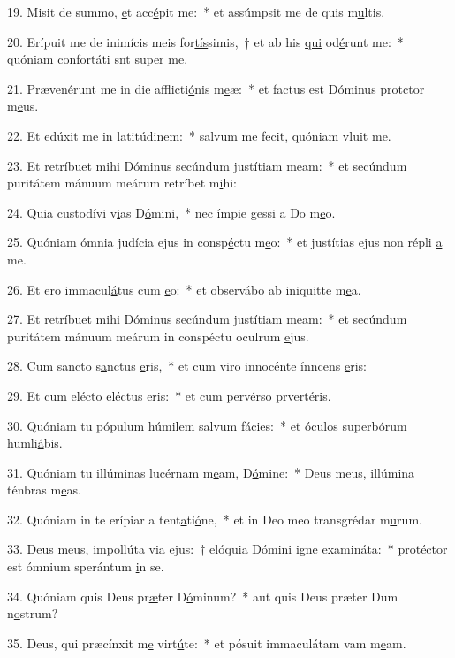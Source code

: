19. Misit de summo, \uline{e}t acc\uline{é}pit me:~* et assúmpsit me de quis m\uline{u}ltis.\par 
20. Erípuit me de inimícis meis for\uline{tís}simis,~† et ab his \uline{qui} od\uline{é}runt me:~* quóniam confortáti snt sup\uline{e}r me.\par 
21. Prævenérunt me in die afflicti\uline{ó}nis m\uline{e}æ:~* et factus est Dóminus protctor m\uline{e}us.\par 
22. Et edúxit me in l\uline{a}tit\uline{ú}dinem:~* salvum me fecit, quóniam vlu\uline{i}t me.\par 
23. Et retríbuet mihi Dóminus secúndum just\uline{í}tiam m\uline{e}am:~* et secúndum puritátem mánuum meárum retríbet m\uline{i}hi:\par 
24. Quia custodívi v\uline{i}as D\uline{ó}mini,~* nec ímpie gessi a Do m\uline{e}o.\par 
25. Quóniam ómnia judícia ejus in consp\uline{é}ctu m\uline{e}o:~* et justítias ejus non répli \uline{a} me.\par 
26. Et ero immacul\uline{á}tus cum \uline{e}o:~* et observábo ab iniquitte m\uline{e}a.\par 
27. Et retríbuet mihi Dóminus secúndum just\uline{í}tiam m\uline{e}am:~* et secúndum puritátem mánuum meárum in conspéctu oculrum \uline{e}jus.\par 
28. Cum sancto s\uline{a}nctus \uline{e}ris,~* et cum viro innocénte ínncens \uline{e}ris:\par 
29. Et cum elécto el\uline{é}ctus \uline{e}ris:~* et cum pervérso prvert\uline{é}ris.\par 
30. Quóniam tu pópulum húmilem s\uline{a}lvum f\uline{á}cies:~* et óculos superbórum humli\uline{á}bis.\par 
31. Quóniam tu illúminas lucérnam m\uline{e}am, D\uline{ó}mine:~* Deus meus, illúmina ténbras m\uline{e}as.\par 
32. Quóniam in te erípiar a tent\uline{a}ti\uline{ó}ne,~* et in Deo meo transgrédar m\uline{u}rum.\par 
33. Deus meus, impollúta via \uline{e}jus:~† elóquia Dómini igne ex\uline{a}min\uline{á}ta:~* protéctor est ómnium sperántum \uline{i}n se.\par 
34. Quóniam quis Deus pr\uline{æ}ter D\uline{ó}minum?~* aut quis Deus præter Dum n\uline{o}strum?\par 
35. Deus, qui præcínxit m\uline{e} virt\uline{ú}te:~* et pósuit immaculátam vam m\uline{e}am.\par 
